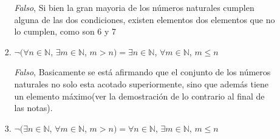 \documentclass[a4paper,10pt]{article}
\newcommand{\naturales}{\mathbb{N}}
\begin{document}
\begin{enumerate}
\begin{enumerate}[label = \roman*)]
\begin{enumerate}[label = \alph*)]
                \begin{center}
                    \noindent{}
                \end{center}
                \vspace{12pt}
                \colorbox{g}{\textit{Falso}}, Si bien la gran mayoria de los n\'umeros naturales cumplen alguna de las dos condiciones, existen elementos dos elementos que no lo cumplen, como son 6 y 7\\
                \item $\neg(\forall n \in \naturales$, $ \exists m \in \naturales$, $m > n)=\exists n \in \naturales$, $\forall m\in \naturales$, $m \leq n$\\ 
                \begin{center}
                    \noindent{}
                \end{center}
                \vspace{12pt}
                \colorbox{g}{\textit{Falso}}, Basicamente se est\'a afirmando que el conjunto de los n\'umeros naturales no solo esta acotado superiormente, sino que adem\'as tiene un elemento m\'aximo(ver la demostraci\'on de lo contrario al final de las notas).\\
                \item $\neg(\exists n \in \naturales$, $ \forall m \in \naturales$, $m > n)=\forall n \in \naturales$, $\exists m\in \naturales$, $m \leq n$\\ 
                \begin{center}
                    \noindent{}
\end{center}
\end{enumerate}
\end{enumerate}
\end{enumerate}
\end{document}

